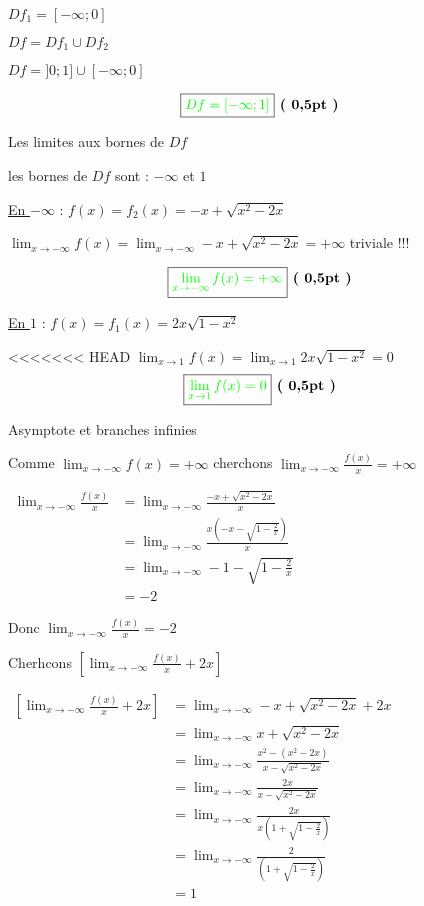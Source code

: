 \documentclass[12pt,a4paper]{article}
\begin{document}
\begin{enumerate}
    \underline{\( Df_1 = [-\infty;0] \)}
	    
	\( Df = Df_1 \cup Df_2 \)    
    
    \( Df = ]0;1] \cup [-\infty;0] \)
    
    \[ \boxed{\textcolor{green}{Df = [-\infty;1]}} \textbf{ ( 0,5pt )} \] 
    
    Les limites aux bornes de \( Df \)
    
	les bornes de \( Df \) sont  :  \(-\infty\) et \( 1 \)
    
\underline{En \(-\infty\)} : \( f(x) = f_{2}(x) = -x + \sqrt{x^2 - 2x} \)

\( \lim_{x \to -\infty} f(x) = \lim_{x \to -\infty} -x + \sqrt{x^2 - 2x} = +\infty \) triviale !!!

\[ \boxed{\textcolor{green}{ \lim_{x \to -\infty} f(x) = +\infty }} \textbf{ ( 0,5pt )} \]

\underline{En \( 1 \)} : \( f(x) = f_{1}(x) = 2x\sqrt{1 - x^2} \)

<<<<<<< HEAD
\( \lim_{x \to 1} f(x) = \lim_{x \to 1} 2x\sqrt{1 - x^2} = 0 \)
\[ \boxed{\textcolor{green}{ \lim_{x \to 1} f(x) = 0 }} \textbf{ ( 0,5pt )} \]

Asymptote et branches infinies

Comme $ \lim_{x \to -\infty} f(x) = +\infty $ cherchons $ \lim_{x \to -\infty} \frac{f(x)}{x} = +\infty $

$
\begin{aligned}
\lim_{x \to -\infty} \frac{f(x)}{x} &=\lim_{x \to -\infty} \frac{-x+\sqrt{x^{2}-2x}}{x} \\
																		&=\lim_{x \to -\infty} \frac{x\left(-x-\sqrt{1-\frac{2}{x}} \right) }{x}\\
																		&=\lim_{x \to -\infty} -1-\sqrt{1-\frac{2}{x}}\\
																		&=-2
\end{aligned}
$

Donc $\lim_{x \to -\infty} \frac{f(x)}{x}=-2$

Cherhcons $ \left[ \lim_{x \to -\infty} \frac{f(x)}{x} + 2x \right] $

$
\begin{aligned}
\left[ \lim_{x \to -\infty} \frac{f(x)}{x} + 2x \right] &=\lim_{x \to -\infty} -x+\sqrt{x^{2}-2x}+2x \\
																												&=\lim_{x \to -\infty} x+\sqrt{x^{2}-2x}\\
																												&=\lim_{x \to -\infty} \frac{x^{2}-(x^{2}-2x)}{x-\sqrt{x^{2}-2x}}\\
																												&=\lim_{x \to -\infty} \frac{2x}{x-\sqrt{x^{2}-2x}}\\
																												&=\lim_{x \to -\infty} \frac{2x}{x\left( 1+\sqrt{1-\frac{2}{x} }\right)}\\
																												&=\lim_{x \to -\infty} \frac{2}{\left( 1+\sqrt{1-\frac{2}{x} }\right)}\\
																												&=1
\end{aligned}
$


\end{enumerate}
\end{document}
